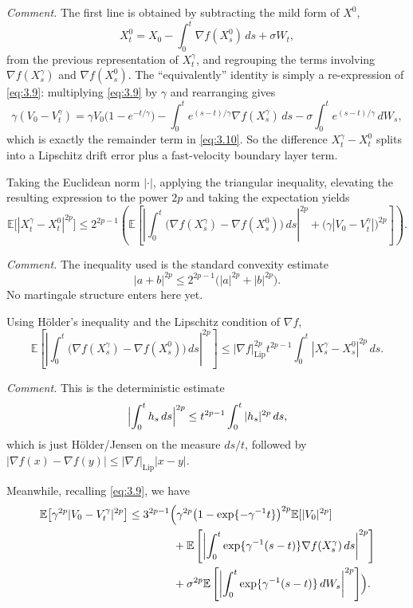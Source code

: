 \documentclass[11pt]{article}
\theoremstyle{remark}
\begin{document}
{\color{teal}
\noindent\emph{Comment.} The first line is obtained by subtracting the mild form of $X^0$,
\[
X_t^0=X_0-\int_0^t \nabla f(X_s^0)\,ds+\sigma W_t,
\]
from the previous representation of $X_t^\gamma$, and regrouping the terms involving $\nabla f(X_s^\gamma)$ and $\nabla f(X_s^0)$. The ``equivalently'' identity is simply a re-expression of \eqref{eq:3.9}: multiplying \eqref{eq:3.9} by $\gamma$ and rearranging gives
\[
\gamma(V_0-V_t^\gamma)
=
\gamma V_0\bigl(1-e^{-t/\gamma}\bigr)
-\int_0^t e^{(s-t)/\gamma}\nabla f(X_s^\gamma)\,ds
-\sigma\int_0^t e^{(s-t)/\gamma}\,dW_s,
\]
which is exactly the remainder term in \eqref{eq:3.10}. So the difference $X_t^\gamma-X_t^0$ splits into a Lipschitz drift error plus a fast-velocity boundary layer term.
}

Taking the Euclidean norm $|\cdot|$, applying the triangular inequality, elevating the resulting expression to the power $2p$ and taking the expectation yields
\begin{equation}
\label{eq:3.11}
\mathbb{E}\bigl[|X_t^{\gamma}-X_t^0|^{2p}\bigr]\le 2^{2p-1}\left(\mathbb{E}\left[\left|\int_0^t \bigl(\nabla f(X_s^{\gamma})-\nabla f(X_s^0)\bigr)\,ds\right|^{2p}+\bigl(\gamma|V_0-V_t^{\gamma}|\bigr)^{2p}\right]\right).
\end{equation}

{\color{teal}
\noindent\emph{Comment.} The inequality used is the standard convexity estimate
\[
|a+b|^{2p}\le 2^{2p-1}\bigl(|a|^{2p}+|b|^{2p}\bigr).
\]
No martingale structure enters here yet.
}

Using H\"older's inequality and the Lipschitz condition of $\nabla f$,
\[
\mathbb{E}\left[\left|\int_0^t \bigl(\nabla f(X_s^{\gamma})-\nabla f(X_s^0)\bigr)\,ds\right|^{2p}\right]\le |\nabla f|_{\mathrm{Lip}}^{2p} t^{2p-1}\int_0^t |X_s^{\gamma}-X_s^0|^{2p}\,ds.
\]

{\color{teal}
\noindent\emph{Comment.} This is the deterministic estimate
\[
\Bigl|\int_0^t h_s\,ds\Bigr|^{2p}\le t^{2p-1}\int_0^t |h_s|^{2p}\,ds,
\]
which is just H\"older/Jensen on the measure $ds/t$, followed by $| \nabla f(x)-\nabla f(y)|\le |\nabla f|_{\mathrm{Lip}}|x-y|$.
}

Meanwhile, recalling \eqref{eq:3.9}, we have
\[
\begin{aligned}
\mathbb{E}\bigl[\gamma^{2p}|V_0-V_t^{\gamma}|^{2p}\bigr]
&\le 3^{2p-1}\Bigl(\gamma^{2p}\bigl(1-\exp\{-\gamma^{-1}t\}\bigr)^{2p}\mathbb{E}[|V_0|^{2p}] \\
&\qquad\qquad +\mathbb{E}\left[\left|\int_0^t \exp\{\gamma^{-1}(s-t)\}\nabla f(X_s^{\gamma})\,ds\right|^{2p}\right] \\
&\qquad\qquad +\sigma^{2p}\mathbb{E}\left[\left|\int_0^t \exp\{\gamma^{-1}(s-t)\}\,dW_s\right|^{2p}\right]\Bigr).
\end{aligned}
\]
\end{document}
